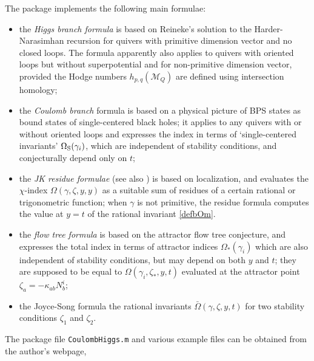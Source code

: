 \documentclass[12pt]{article}
\newcommand\bOm{\bar\Omega}
\newcommand{\cM}{\mathcal{M}}
\newcommand{\OmS}{\Omega_{\rm S}}
\newcommand{\Omatt}{\Omega_*}
\begin{document}
The package implements the following main formulae:
 \begin{itemize}
 
 \item  the {\it Higgs branch formula} is  based on Reineke's solution to the Harder-Narasimhan recursion \cite{MR1974891} for quivers with primitive dimension vector and no closed loops. 
 The formula apparently also applies to quivers with oriented loops but without superpotential 
 and for non-primitive dimension vector, provided the Hodge numbers $h_{p,q}(\cM_Q)$
 are defined using intersection homology;
 
 \item the {\it Coulomb branch} formula \cite{1011.1258,1103.1887,Manschot:2012rx,Manschot:2014fua} is based on a physical picture of BPS states as bound states of single-centered black holes; it applies to any quivers with or without oriented loops  and expresses the index in terms
 of `single-centered invariants' $\OmS(\gamma_i)$, which are independent of stability conditions,
 and conjecturally depend only on $t$;
 
\item the  {\it JK residue formulae} \cite{Hori:2014tda} (see also \cite{Cordova:2014oxa,Benini:2013xpa}) is based on localization, and evaluates the $\chi$-index
$\Omega(\gamma,\zeta,y,y)$ as a suitable sum of residues of a certain rational or trigonometric function; when $\gamma$ is not primitive, the residue formula computes the value at $y=t$ of the rational invariant
\eqref{defbOm}.

\item the  {\it flow tree formula} \cite{Alexandrov:2018iao} is based on 
 the attractor flow tree conjecture, and expresses the total index in terms of attractor indices
 $\Omatt(\gamma_i)$ which are also independent of stability conditions, but may depend on both 
 $y$ and $t$; they are supposed to be equal to $\Omega(\gamma_i,\zeta_*,y,t)$ evaluated at
 the attractor point $\zeta_a=-\kappa_{ab} N_b^i$;  

\item the Joyce-Song formula \cite{JoyceConfig}  the rational invariants $\bOm(\gamma,\zeta,y,t)$ for two stability conditions $\zeta_1$ and $\zeta_2$. 

\end{itemize}



\medskip

The package file {\tt CoulombHiggs.m} and various example files 
can be obtained from the author's webpage,
\vskip 2mm
\end{document}

